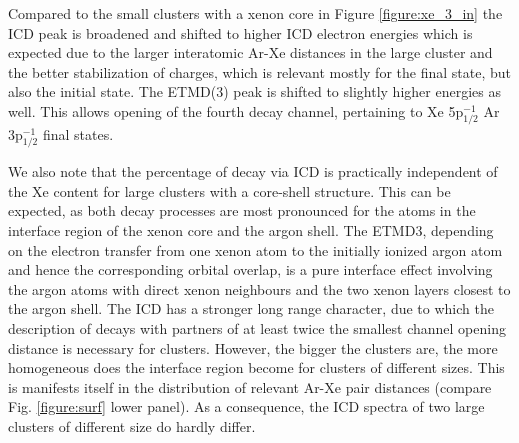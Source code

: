 Compared to the small clusters with a xenon core in Figure \ref{figure:xe_3_in}
the ICD peak is broadened and shifted to higher ICD electron energies which is
expected due to the larger interatomic Ar-Xe distances in the large cluster and
the better stabilization of charges, which is relevant mostly for the final state, but also the initial state.
The ETMD(3) peak is shifted to slightly higher energies as well. This allows opening of the
fourth decay channel, pertaining to Xe 5p$_{1/2}^{-1}$ Ar 3p$_{1/2}^{-1}$ final states.

We also note that the percentage of decay via ICD is practically
independent of the Xe content for large clusters with a core-shell structure.
This can be expected, as both decay processes are most pronounced for the
atoms in the interface region of the xenon core and the argon shell.
The ETMD3, depending on the electron transfer from one xenon atom to the
initially ionized argon atom and hence the corresponding orbital overlap,
is a pure interface effect involving the argon atoms with direct xenon
neighbours and the two xenon layers closest to the argon shell.
The ICD has a stronger long range character, due to which the description
of decays with partners of at least twice the smallest channel opening
distance is necessary for clusters. However, the bigger the clusters are,
the more homogeneous does the interface region become for clusters of
different sizes. This is manifests itself in the distribution of relevant
Ar-Xe pair distances (compare Fig. \ref{figure:surf} lower panel).
As a consequence, the ICD spectra of two large clusters of different size
do hardly differ.

